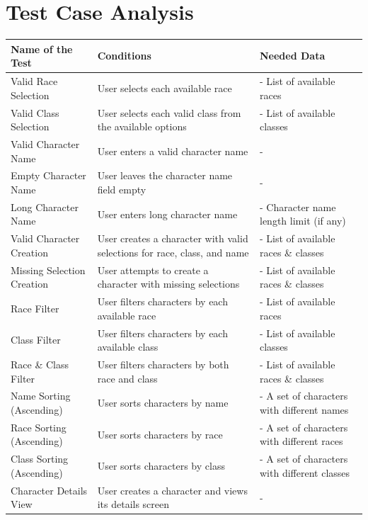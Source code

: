 \documentclass{article}
\begin{document}
\section{Test Case Analysis}
\begin{table}[htbp]
\begin{tabular}{|p{5cm}|p{6cm}|p{6cm}|}
\hline
\textbf{Name of the Test} & \textbf{Conditions} & \textbf{Needed Data} \\ \hline
Valid Race Selection & User selects each available race & - List of available races \\ \hline
Valid Class Selection & User selects each valid class from the available options & - List of available classes \\ \hline
Valid Character Name & User enters a valid character name & - \\ \hline
Empty Character Name & User leaves the character name field empty & - \\ \hline
Long Character Name & User enters long character name & - Character name length limit (if any) \\ \hline
Valid Character Creation & User creates a character with valid selections for race, class, and name & - List of available races \& classes \\ \hline
Missing Selection Creation & User attempts to create a character with missing selections & - List of available races \& classes \\ \hline
Race Filter & User filters characters by each available race & - List of available races \\ \hline
Class Filter & User filters characters by each available class & - List of available classes \\ \hline
Race \& Class Filter & User filters characters by both race and class & - List of available races \& classes \\ \hline
Name Sorting (Ascending) & User sorts characters by name & - A set of characters with different names \\ \hline
Race Sorting (Ascending) & User sorts characters by race & - A set of characters with different races \\ \hline
Class Sorting (Ascending) & User sorts characters by class & - A set of characters with different classes \\ \hline
Character Details View & User creates a character and views its details screen & - \\ \hline
\end{tabular}
\end{table}
\end{document}
